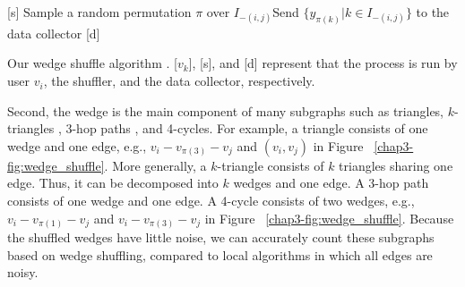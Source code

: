 \setlength{\algomargin}{5mm}
\begin{algorithm}[t]
  \SetAlgoLined
  [s] Sample a random permutation $\pi$ over $I_{-(i,j)}$\;
  [s] Send $\{y_{\pi(k)} | k \in I_{-(i,j)}\}$ to the data collector\;
  [d] 
  \caption[Our wedge shuffle algorithm \AlgWS{}.]{Our wedge shuffle algorithm \AlgWS{}. 
  [$v_k$], [s], and [d] represent that the process is run by user $v_i$, the shuffler, and the data collector, respectively. 
  }\label{chap3-alg:WShuffle}
\end{algorithm}

Second, the wedge is the main component of many subgraphs such as triangles, 
$k$-triangles \cite{Karwa_PVLDB11}, 
3-hop paths \cite{Sun_CCS19}, 
and 4-cycles. 
For example, a triangle consists of one wedge and one edge, e.g., $v_i-v_{\pi(3)}-v_j$ and $(v_i, v_j)$ in Figure ~\ref{chap3-fig:wedge_shuffle}. 
More generally, a $k$-triangle consists of $k$ triangles sharing one edge. 
Thus, it can be decomposed into $k$ wedges and one edge. 
A 3-hop path consists of one wedge and one edge. 
A 4-cycle consists of two wedges, e.g., $v_i-v_{\pi(1)}-v_j$ and $v_i-v_{\pi(3)}-v_j$ in Figure ~\ref{chap3-fig:wedge_shuffle}. 
Because the shuffled wedges have little noise, we can accurately count these subgraphs based on wedge shuffling, compared to local algorithms in which all edges are noisy. 

